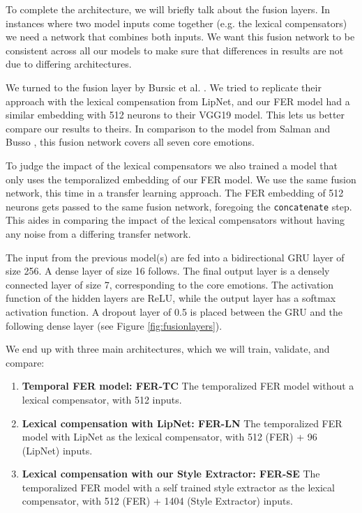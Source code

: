 To complete the architecture, we will briefly talk about the fusion layers. In instances where two model inputs come together (e.g. the lexical compensators) we need a network that combines both inputs. We want this fusion network to be consistent across all our models to make sure that differences in results are not due to differing architectures.

We turned to the fusion layer by Bursic et al. \cite{bursic2020improving}. We tried to replicate their approach with the lexical compensation from LipNet, and our FER model had a similar embedding with 512 neurons to their VGG19 model. This lets us better compare our results to theirs. In comparison to the model from Salman and Busso \cite{salman2020style}, this fusion network covers all seven core emotions.

To judge the impact of the lexical compensators we also trained a model that only uses the temporalized embedding of our FER model. We use the same fusion network, this time in a transfer learning approach. The FER embedding of 512 neurons gets passed to the same fusion network, foregoing the \texttt{concatenate} step. This aides in comparing the impact of the lexical compensators without having any noise from a differing transfer network.

The input from the previous model(s) are fed into a bidirectional GRU layer of size 256. A dense layer of size 16 follows. The final output layer is a densely connected layer of size 7, corresponding to the core emotions. The activation function of the hidden layers are ReLU, while the output layer has a softmax activation function. A dropout layer of 0.5 is placed between the GRU and the following dense layer (see Figure \ref{fig:fusionlayers}).

We end up with three main architectures, which we will train, validate, and compare:

\begin{enumerate}
    \item \textbf{Temporal FER model: FER-TC} The temporalized FER model without a lexical compensator, with 512 inputs.
    \item \textbf{Lexical compensation with LipNet: FER-LN} The temporalized FER model with LipNet as the lexical compensator, with 512 (FER) + 96 (LipNet) inputs.
    \item \textbf{Lexical compensation with our Style Extractor: FER-SE} The temporalized FER model with a self trained style extractor as the lexical compensator, with 512 (FER) + 1404 (Style Extractor) inputs.
\end{enumerate}

